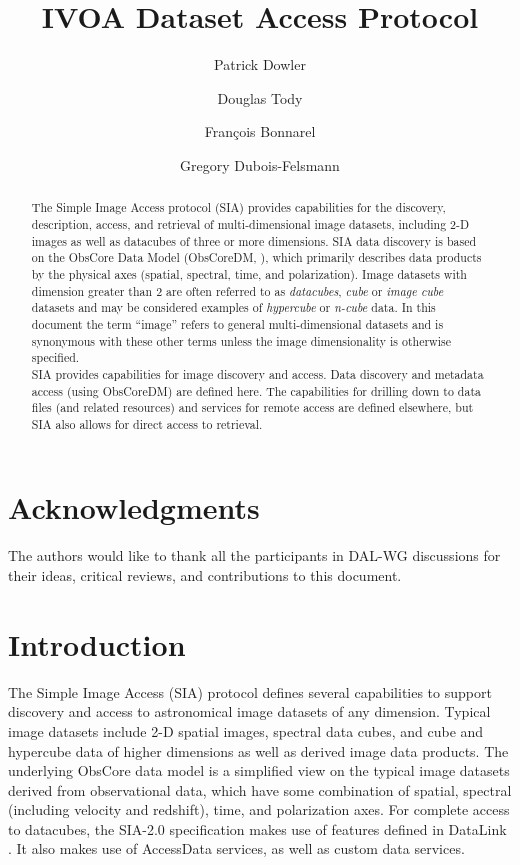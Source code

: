 \documentclass[11pt,a4paper]{ivoa}
\title{IVOA Dataset Access Protocol}
\author{Patrick Dowler}
\author{Douglas Tody}
\author{Fran\c cois Bonnarel}
\author{Gregory Dubois-Felsmann}
\begin{document}
\begin{abstract}
The Simple Image Access protocol (SIA) provides capabilities for the discovery, description, access, and retrieval of multi-dimensional image datasets, including 2-D images as well as datacubes of three or more dimensions.  SIA data discovery is based on the ObsCore Data Model (ObsCoreDM, \citet{2017ivoa.spec.0509L}), which primarily describes data products by the physical axes (spatial, spectral, time, and polarization). Image datasets with dimension greater than 2 are often referred to as \textit{datacubes}, \textit{cube} or \textit{image cube} datasets and may be considered examples of \textit{hypercube} or \textit{n-cube} data.  In this document the term “image” refers to general multi-dimensional datasets and is synonymous with these other terms unless the image dimensionality is otherwise specified. \\
SIA provides capabilities for image discovery and access. Data discovery and  metadata access (using ObsCoreDM) are defined here. The capabilities for drilling down  to data files (and related resources) and services for remote access are defined elsewhere, but SIA also allows for direct access to retrieval.
\end{abstract}
\section*{Acknowledgments}
The authors would like to thank all the participants in DAL-WG discussions  for their ideas, critical reviews, and contributions to this document.

\section{Introduction}
The Simple Image Access (SIA) protocol defines several capabilities to support discovery and access to astronomical image datasets of any dimension.  Typical image datasets include 2-D spatial images, spectral data cubes, and cube and hypercube data of higher dimensions as well as derived image data products.  The underlying ObsCore data model is a simplified view on the typical image datasets derived from observational data, which have some combination of spatial, spectral (including velocity and redshift), time, and polarization axes.
For complete access to datacubes, the SIA-2.0 specification  makes use of features defined in DataLink \citep{2023ivoa.spec.1215B}. It also makes use of AccessData services, as well as custom data services.
\end{document}

